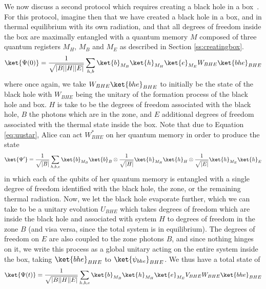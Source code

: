\documentclass[11pt,a4paper]{article}
\begin{document}
We now discuss a second protocol which requires creating a black hole in a box~\cite{hawking1976black,hawking1983thermodynamics}.  For this protocol,
imagine then that we have 
created a black hole in a box, and in thermal equilibrium with its own radiation, and that all degrees of freedom inside the box are maximally 
entangled with a quantum memory $M$ composed of three quantum registers $M_H$, $M_B$ and $M_E$ as described in Section \ref{ss:creatingbox}.
\begin{align}
\ket{\Psi(0)}=\frac{1}{\sqrt{|B||H||E|}}
\sum_{h,b}\ket{b}_{M_B}\ket{h}_{M_H}\ket{e}_{M_E} W_{BHE} \ket{bhe}_{BHE}
\end{align}
where once again, we take $W_{BHE}\ket{bhe}_{BHE}$ to initially be the state of the black hole with $W_{BHE}$ being the unitary of the formation process of the black hole and box.  $H$ is take to be the degrees of freedom associated with the black hole, $B$ the photons which are in the zone, and $E$ additional degrees of freedom associated
with the thermal state inside the box. 
Note that due to Equation \eqref{eq:uustar}, Alice can act $W^*_{BHE}$ on her quantum memory in order to  produce the state
\begin{align}
\ket{\Psi'}=\frac{1}{\sqrt{|B|}}
\sum_{h,b,e}\ket{b}_{M_B}\ket{b}_B\otimes \frac{1}{\sqrt{|H|}}\ket{h}_{M_H} \ket{h}_{H}\otimes\frac{1}{\sqrt{|E|}}\ket{h}_{M_E} \ket{h}_{E}
\label{eq:decodeduustar}
\end{align}
in which each of the qubits of her quantum memory is entangled with a single degree of freedom identified with the black hole, the zone, or the remaining thermal radiation.
Now, we let the black hole evaporate further, which we can take to be a unitary evolution $U_{BHE}$ which takes 
degrees of freedom which are inside the black hole and associated with system $H$ to degrees of freedom in the zone $B$ (and visa versa, since the total system is in equilibrium). 
The degrees of freedom on $E$ are also coupled to the zone photons $B$, and since nothing hinges on it, we write this process as a global unitary acting on the entire system inside the box, taking  $\ket{bhe}_{BHE}$ to $\ket{\psi_{bhe}}_{BHE}$. We thus have a total state of 
\begin{align}
\ket{\Psi(t)}=\frac{1}{\sqrt{|B||H||E|}}
\sum_{h,b,e}\ket{b}_{M_B}\ket{h}_{M_H}\ket{e}_{M_E} V_{BHE}W_{BHE} \ket{bhe}_{BHE}
\label{eq:before}
\end{align}
\end{document}

